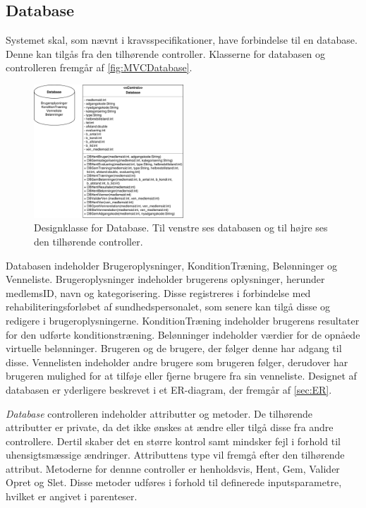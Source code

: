\subsection*{Database} \label{sec:databaseDesign}
Systemet skal, som nævnt i kravsspecifikationer, have forbindelse til en database. Denne kan tilgås fra den tilhørende controller. Klasserne for databasen og controlleren fremgår af \autoref{fig:MVCDatabase}. 

\begin{figure} [H]
\centering
\includegraphics[width=0.5\textwidth]{figures/MVC/MVCDatabase}
\caption{Designklasse for Database. Til venstre ses databasen og til højre ses den tilhørende controller.}
\label{fig:MVCDatabase}
\end{figure}

\noindent
Databasen indeholder Brugeroplysninger, KonditionTræning, Belønninger og Venneliste. Brugeroplysninger indeholder brugerens oplysninger, herunder medlemsID, navn og kategorisering. Disse registreres i forbindelse med rehabiliteringsforløbet af sundhedspersonalet, som senere kan tilgå disse og redigere i brugeroplysningerne.  KonditionTræning indeholder brugerens resultater for den udførte konditionstræning. Belønninger indeholder værdier for de opnåede virtuelle belønninger. Brugeren og de brugere, der følger denne har adgang til disse. Vennelisten indeholder andre brugere som brugeren følger, derudover har brugeren mulighed for at tilføje eller fjerne brugere fra sin venneliste. Designet af databasen er yderligere beskrevet i et ER-diagram, der fremgår af \autoref{sec:ER}. 

\textit{Database} controlleren indeholder attributter og metoder. De tilhørende attributter er private, da det ikke ønskes at ændre eller tilgå disse fra andre controllere. Dertil skaber det en større kontrol samt mindsker fejl i forhold til uhensigtsmæssige ændringer. Attributtens type vil fremgå efter den tilhørende attribut. Metoderne for dennne controller er henholdsvis, Hent, Gem, Valider Opret og Slet. Disse metoder udføres i forhold til definerede inputsparametre, hvilket er angivet i parenteser. 

